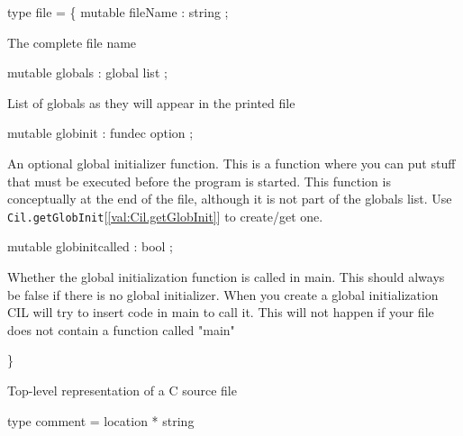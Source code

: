\documentclass[11pt]{article}
\begin{document}
\label{type:Cil.file}\begin{ocamldoccode}
type file = \{
  mutable fileName : string ;
\end{ocamldoccode}
\begin{ocamldoccomment}
The complete file name
\end{ocamldoccomment}
\begin{ocamldoccode}
  mutable globals : global list ;
\end{ocamldoccode}
\begin{ocamldoccomment}
List of globals as they will appear 
                                        in the printed file
\end{ocamldoccomment}
\begin{ocamldoccode}
  mutable globinit : fundec option ;
\end{ocamldoccode}
\begin{ocamldoccomment}
An optional global initializer function. This is a function where 
 you can put stuff that must be executed before the program is 
 started. This function is conceptually at the end of the file, 
 although it is not part of the globals list. Use {\tt{Cil.getGlobInit}}[\ref{val:Cil.getGlobInit}] 
 to create/get one.
\end{ocamldoccomment}
\begin{ocamldoccode}
  mutable globinitcalled : bool ;
\end{ocamldoccode}
\begin{ocamldoccomment}
Whether the global initialization function is called in main. This 
 should always be false if there is no global initializer. When you 
 create a global initialization CIL will try to insert code in main 
 to call it. This will not happen if your file does not contain a 
 function called "main"
\end{ocamldoccomment}
\begin{ocamldoccode}
\}
\end{ocamldoccode}
\begin{ocamldocdescription}
Top-level representation of a C source file


\end{ocamldocdescription}




\label{type:Cil.comment}\begin{ocamldoccode}
type comment = location * string 
\end{ocamldoccode}
\end{document}
